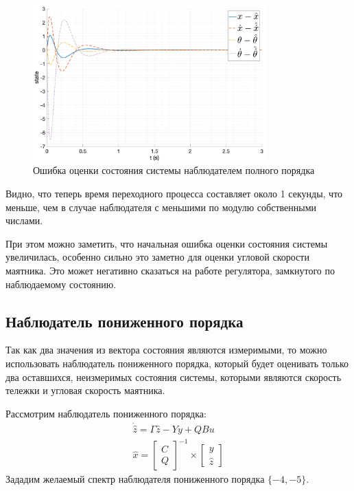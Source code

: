 \begin{figure}[ht!]
    \centering
    \includegraphics[width=0.8\textwidth]{media/plots/modal_observer/observer_err_2.png}
    \caption{Ошибка оценки состояния системы наблюдателем полного порядка}
    \label{fig:observer_err_2}
\end{figure}
\FloatBarrier
Видно, что теперь время переходного процесса составляет около 1 секунды, что меньше, чем в случае 
наблюдателя с меньшими по модулю собственными числами. 

При этом можно заметить, что начальная ошибка оценки состояния системы увеличилась, особенно сильно это заметно
для оценки угловой скорости маятника. Это может негативно сказаться на работе регулятора, замкнутого по наблюдаемому состоянию.

\subsection{Наблюдатель пониженного порядка}
Так как два значения из вектора состояния являются измеримыми, то можно использовать наблюдатель пониженного порядка, 
который будет оценивать только два оставшихся, неизмеримых состояния системы, которыми являются скорость тележки и угловая скорость маятника.

Рассмотрим наблюдатель пониженного порядка:
\begin{equation}
    \begin{array}{ll}
        \dot{\hat{z}} = \Gamma\hat{z} - Yy + QBu\\
        \hat{x} = \begin{bmatrix}
            C \\ Q
        \end{bmatrix}^{-1} \times \begin{bmatrix}
            y \\ 
            \hat{z}
        \end{bmatrix}
    \end{array}
\end{equation}
Зададим желаемый спектр наблюдателя пониженного порядка $\{-4, -5\}$.

